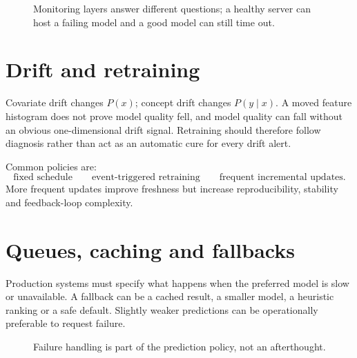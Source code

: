 \begin{figure}[htbp]
\centering
{}
\caption{Monitoring layers answer different questions; a healthy server can host a failing model and a good model can still time out.}
\end{figure}

\section{Drift and retraining}
\label{sec:systems-drift-retraining}
Covariate drift changes $P(x)$; concept drift changes $P(y\mid x)$.
A moved feature histogram does not prove model quality fell, and model quality can fall without an obvious one-dimensional drift signal.
Retraining should therefore follow diagnosis rather than act as an automatic cure for every drift alert.

Common policies are:
\[
\text{fixed schedule}
\qquad
\text{event-triggered retraining}
\qquad
\text{frequent incremental updates}.
\]
More frequent updates improve freshness but increase reproducibility, stability and feedback-loop complexity.

\section{Queues, caching and fallbacks}
\label{sec:systems-fallbacks}
Production systems must specify what happens when the preferred model is slow or unavailable.
A fallback can be a cached result, a smaller model, a heuristic ranking or a safe default.
Slightly weaker predictions can be operationally preferable to request failure.

\begin{figure}[htbp]
\centering
{}
\caption{Failure handling is part of the prediction policy, not an afterthought.}
\end{figure}

